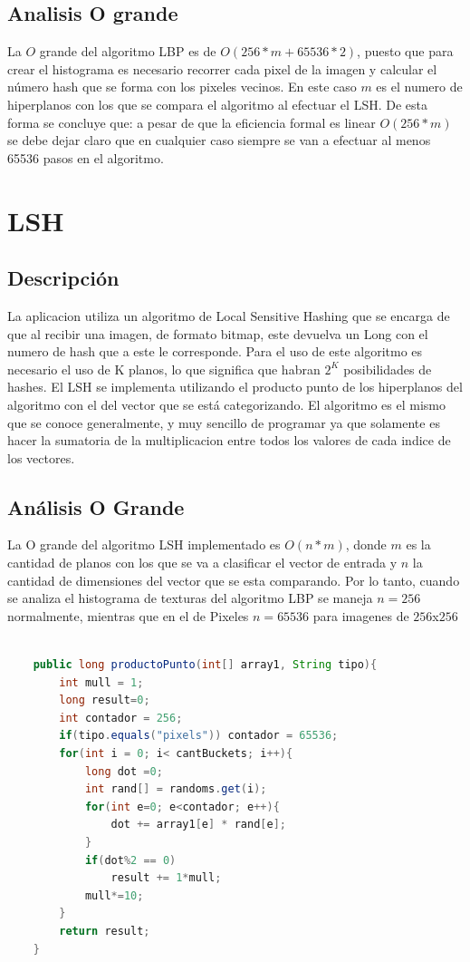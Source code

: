 \documentclass[12pt,twocolumn,letterpaper]{article}
\begin{document}
\begin{lstlisting}[language=Java]
	\end{lstlisting}
	
\subsection{Analisis O grande}
La $O$ grande del algoritmo LBP es de $O(256*m+65536*2)$, puesto que para crear el histograma es necesario recorrer cada pixel de la imagen y calcular el n\'umero hash que se forma con los pixeles vecinos. En este caso $m$ es el numero de hiperplanos con los que se compara el algoritmo al efectuar el LSH. De esta forma se concluye que: a pesar de que la eficiencia formal es linear $O(256*m)$ se debe dejar claro que en cualquier caso siempre se van a efectuar al menos 65536 pasos en el algoritmo.
\section{LSH}
\subsection{Descripci\'on}
La aplicacion utiliza un algoritmo de Local Sensitive Hashing que se encarga de que al recibir una imagen, de formato bitmap, este devuelva un Long con el numero de hash que a este le corresponde.
Para el uso de este algoritmo es necesario el uso de K planos, lo que significa que habran $2^K$ posibilidades de hashes.
El LSH se implementa utilizando el producto punto de los hiperplanos del algoritmo con el del vector que se est\'a categorizando.
El algoritmo es el mismo que se conoce generalmente, y muy sencillo de programar ya que solamente es hacer la sumatoria de la multiplicacion entre todos los valores de cada indice de los vectores.
\subsection{An\'alisis O Grande}
La O grande del algoritmo LSH implementado es $O(n*m)$, donde $m$ es la cantidad de planos con los que se va a clasificar el vector de entrada y $n$ la cantidad de dimensiones del vector que se esta comparando. Por lo tanto, cuando se analiza el histograma de texturas del algoritmo LBP se maneja $n=256$  normalmente, mientras que en el de Pixeles $n=65536$ para imagenes de $256$x$256$

\begin{lstlisting}[language=Java]

	public long productoPunto(int[] array1, String tipo){
        int mull = 1;
        long result=0;
        int contador = 256;
        if(tipo.equals("pixels")) contador = 65536;
        for(int i = 0; i< cantBuckets; i++){
            long dot =0;
            int rand[] = randoms.get(i);
            for(int e=0; e<contador; e++){
                dot += array1[e] * rand[e];
            }
            if(dot%2 == 0)
                result += 1*mull;
            mull*=10;
        }
        return result;
    }

	\end{lstlisting}
	
\end{document}
